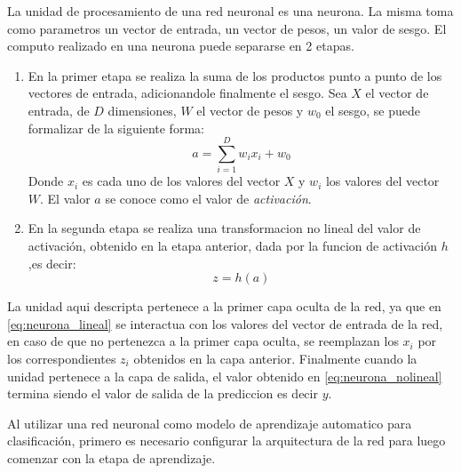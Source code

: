 \documentclass[a4paper,11pt,spanish]{book}
\begin{document}
	La unidad de procesamiento de una red neuronal es una neurona. La misma toma como parametros un vector de entrada, un vector de pesos, un valor de sesgo. El computo realizado
	en una neurona puede separarse en 2 etapas.
	\begin{enumerate}
	  \item En la primer etapa se realiza la suma de los productos punto a punto de los vectores de entrada, adicionandole finalmente el sesgo.
	    Sea $X$ el vector de entrada, de $D$ dimensiones, $W$ el vector de pesos y $w_0$ el sesgo, se puede formalizar de la siguiente forma:
	    \begin{equation} \label{eq:neurona_lineal}
	      a = \sum_{i=1}^{D} w_{i} x_i + w_{0}
	    \end{equation}
	    Donde $x_i$ es cada uno de los valores del vector $X$ y $w_{i}$ los valores del vector $W$. El valor $a$ se conoce como el valor de \emph{activación}.
	  \item En la segunda etapa se realiza una transformacion no lineal del valor de activación, obtenido en la etapa anterior, dada por la funcion de activación $h$,es decir:
	    \begin{equation}\label{eq:neurona_nolineal}
	      z = h(a)
	    \end{equation}
	\end{enumerate}
	La unidad aqui descripta pertenece a la primer capa oculta de la red, ya que en \eqref{eq:neurona_lineal} se interactua	con los valores del vector de entrada de la red, 
	en caso de que no pertenezca a la primer capa oculta, se reemplazan los $x_i$ por los correspondientes $z_i$
	obtenidos en la capa anterior. Finalmente cuando la unidad pertenece a la capa de salida, el valor obtenido en \eqref{eq:neurona_nolineal} termina siendo el valor de salida
	de la prediccion es decir $y$.
	
	Al utilizar una red neuronal como modelo de aprendizaje automatico para clasificación, primero es necesario configurar la arquitectura de la red para luego comenzar con la etapa de aprendizaje.

\end{document}
